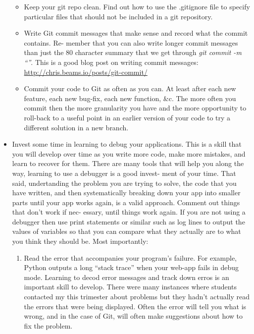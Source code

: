 \documentclass[letterpaper,11pt]{texMemo}
\begin{document}
\begin{itemize}
\begin{itemize}
\item Keep your git repo clean. Find out how to use the .gitignore file to specify particular files that should not be included in a git repository.
\item Write Git commit messages that make sense and record what the commit contains. Re- member that you can also write longer commit messages than just the 80 character summary that we get through \emph{git commit -m ``''}. This is a good blog post on writing commit messages: \url{http://chris.beams.io/posts/git-commit/}
\item Commit your code to Git as often as you can. At least after each new feature, each new bug-fix, each new function, \&c. The more often you commit then the more granularity you have and the more opportunity to roll-back to a useful point in an earlier version of your code to try a different solution in a new branch.

\end{itemize}

\item Invest some time in learning to debug your applications. This is a skill that you will develop over time as you write more code, make more mistakes, and learn to recover for them. There are many tools that will help you along the way, learning to use a debugger is a good invest- ment of your time. That said, undertanding the problem you are trying to solve, the code that you have written, and then systematically breaking down your app into smaller parts until your app works again, is a valid approach. Comment out things that don’t work if nec- essary, until things work again. If you are not using a debugger then use print statements or similar such as log lines to output the values of variables so that you can compare what they actually are to what you think they should be. Most importantly:

\begin{enumerate}

\item Read the error that accompanies your program’s failure. For example, Python outputs a long ``stack trace'' when your web-app fails in debug mode. Learning to decod error messages and track down erros is an important skill to develop. There were many instances where students contacted my this trimester about problems but they hadn't actually read the errors that were being displayed. Often the error will tell you what is wrong, and in the case of Git, will often make suggestions about how to fix the problem.


\end{enumerate}
\end{itemize}
\end{document}
